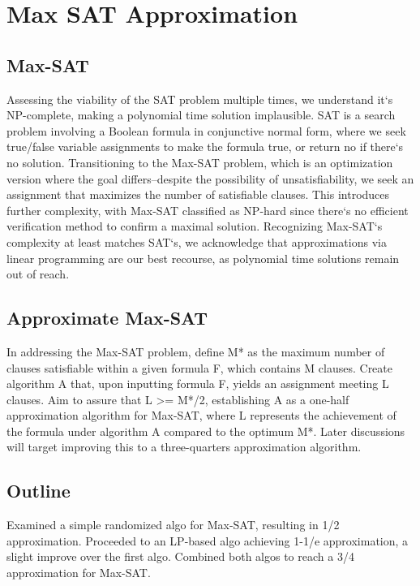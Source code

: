 \section*{Max SAT Approximation}

\subsection*{Max-SAT}
Assessing the viability of the SAT problem multiple times, we understand it`s NP-complete, making a polynomial time solution implausible.
SAT is a search problem involving a Boolean formula in conjunctive normal form, where we seek true/false variable assignments to make the formula true, or return no if there`s no solution.
Transitioning to the Max-SAT problem, which is an optimization version where the goal differs--despite the possibility of unsatisfiability, we seek an assignment that maximizes the number of satisfiable clauses.
This introduces further complexity, with Max-SAT classified as NP-hard since there`s no efficient verification method to confirm a maximal solution.
Recognizing Max-SAT`s complexity at least matches SAT`s, we acknowledge that approximations via linear programming are our best recourse, as polynomial time solutions remain out of reach.

\subsection*{Approximate Max-SAT}
In addressing the Max-SAT problem, define M* as the maximum number of clauses satisfiable within a given formula F, which contains M clauses.
Create algorithm A that, upon inputting formula F, yields an assignment meeting L clauses.
Aim to assure that L \textgreater{}= M*/2, establishing A as a one-half approximation algorithm for Max-SAT, where L represents the achievement of the formula under algorithm A compared to the optimum M*.
Later discussions will target improving this to a three-quarters approximation algorithm.

\subsection*{Outline}
Examined a simple randomized algo for Max-SAT, resulting in 1/2 approximation.
Proceeded to an LP-based algo achieving 1-1/e approximation, a slight improve over the first algo.
Combined both algos to reach a 3/4 approximation for Max-SAT\@.

